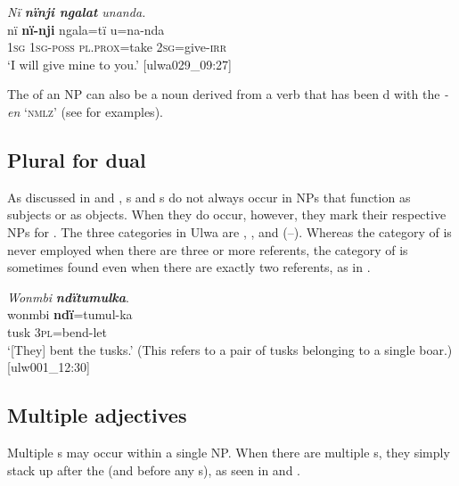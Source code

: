 \ea%
    \label{ex:phrase:4}
            \textit{Nï \textbf{nïnji ngalat} unanda.}\\
\gll    nï    \textbf{nï-nji}    ngala=tï    u=na-nda\\
    1\textsc{sg}  1\textsc{sg-poss}  \textsc{pl.prox}=take  2\textsc{sg}=give-\textsc{irr}\\
\glt `I will give mine to you.’ [ulwa029\_09:27]
\z

The  of an NP can also be a noun derived from a verb that has been d with the  \textit{-en} ‘\textsc{nmlz}’ (see  for examples).



\subsection{Plural for dual}\label{sec:9.1.2}


As discussed in  and , s and s do not always occur in NPs that function as subjects or as objects. When they do occur, however, they mark their respective NPs for . The three  categories in Ulwa are , , and  (--). Whereas the category of  is never employed when there are three or more referents, the category of  is sometimes found even when there are exactly two referents, as in .


\ea%
    \label{ex:phrase:5}
            \textit{Wonmbi} \textbf{\textit{ndïtumulka}}.\\
\gll wonmbi  \textbf{ndï}=tumul-ka\\
    tusk    3\textsc{pl}=bend-let\\
\glt `[They] bent the tusks.’ (This refers to a pair of tusks belonging to a single boar.) [ulw001\_12:30]
\z

\subsection{Multiple adjectives}\label{sec:9.1.3}


Multiple s may occur within a single NP. When there are multiple s, they simply stack up after the  (and before any s), as seen in  and .

